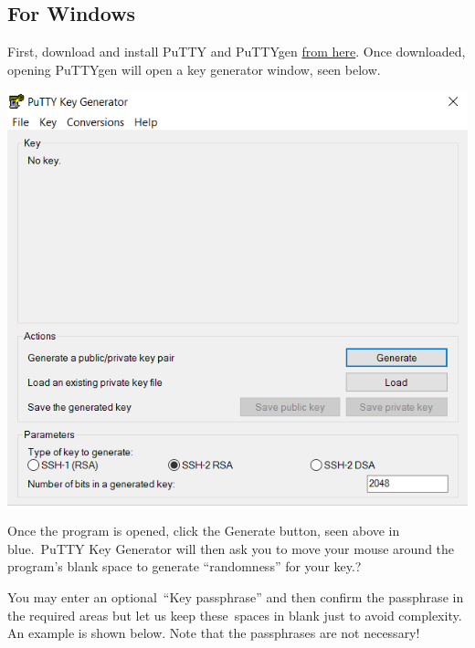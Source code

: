 \subsection{For Windows}\label{for-windows}

First, download and install PuTTY and PuTTYgen
\href{http://www.chiark.greenend.org.uk/~sgtatham/putty/}{from here}.
Once downloaded, opening PuTTYgen will open a key generator window, seen
below.

\includegraphics[width=\columnwidth]{images/chameleon/putty2.png}

Once the program is opened, click the Generate button, seen above in
blue.~PuTTY Key Generator will then ask you to move your mouse around
the program's blank space to generate ``randomness'' for your key.?

You may enter an optional~``Key passphrase'' and then confirm the
passphrase in the required areas but let us keep these~spaces in blank
just to avoid complexity. An example is shown below. Note that the
passphrases are not necessary!


